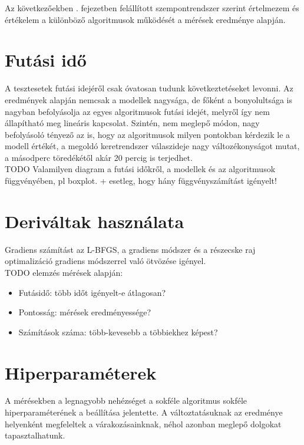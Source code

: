 Az következőekben . fejezetben felállított szempontrendszer szerint értelmezem és értékelem a különböző algoritmusok működését a mérések eredménye alapján.

\section{Futási idő}
A tesztesetek futási idejéről csak óvatosan tudunk következtetéseket levonni. Az eredmények alapján nemcsak a modellek nagysága, de főként a bonyolultsága is nagyban befolyásolja az egyes algoritmusok futási idejét, melyről így nem állapítható meg lineáris kapcsolat. Szintén, nem meglepő módon, nagy befolyásoló tényező az is, hogy az algoritmusok milyen pontokban kérdezik le a modell értékét, a megoldó keretrendszer válaszideje nagy változékonyságot mutat, a másodperc töredékétől akár 20 percig is terjedhet.\\
TODO Valamilyen diagram a futási időkről, a modellek és az algoritmusok függvényében, pl boxplot. + esetleg, hogy hány függvényszámítást igényelt!
\section{Deriváltak használata}
Gradiens számítást az L-BFGS, a gradiens módszer és a részecske raj optimalizáció gradiens módszerrel való ötvözése igényel.\\
{\Huge TODO elemzés mérések alapján:}
\begin{itemize}
	\item Futásidő: több időt igényelt-e átlagosan?
	\item Pontosság: mérések eredményessége?
	\item Számítások száma: több-kevesebb a többiekhez képest?
\end{itemize}

\section{Hiperparaméterek}
A mérésekben a legnagyobb nehézséget a sokféle algoritmus sokféle hiperparaméterének a beállítása jelentette. A változtatásuknak az eredménye helyenként megfeleltek a várakozásainknak, néhol azonban meglepő dolgokat tapasztalhatunk.

